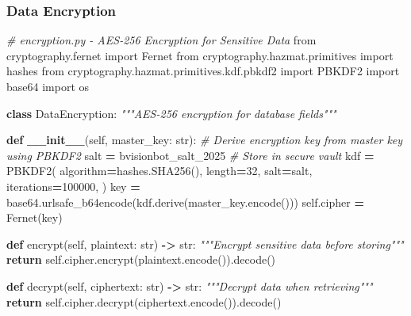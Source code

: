 \documentclass[
]{article}
\newenvironment{Shaded}{\begin{snugshade}}{\end{snugshade}}
\newcommand{\BuiltInTok}[1]{#1}
\newcommand{\CommentTok}[1]{\textcolor[rgb]{0.56,0.35,0.01}{\textit{#1}}}
\newcommand{\ControlFlowTok}[1]{\textcolor[rgb]{0.13,0.29,0.53}{\textbf{#1}}}
\newcommand{\DecValTok}[1]{\textcolor[rgb]{0.00,0.00,0.81}{#1}}
\newcommand{\FunctionTok}[1]{\textcolor[rgb]{0.13,0.29,0.53}{\textbf{#1}}}
\newcommand{\ImportTok}[1]{#1}
\newcommand{\KeywordTok}[1]{\textcolor[rgb]{0.13,0.29,0.53}{\textbf{#1}}}
\newcommand{\NormalTok}[1]{#1}
\newcommand{\OperatorTok}[1]{\textcolor[rgb]{0.81,0.36,0.00}{\textbf{#1}}}
\newcommand{\StringTok}[1]{\textcolor[rgb]{0.31,0.60,0.02}{#1}}
\newcommand{\VariableTok}[1]{\textcolor[rgb]{0.00,0.00,0.00}{#1}}
\begin{document}
\hypertarget{data-encryption}{%
\subsubsection{Data Encryption}\label{data-encryption}}

\begin{Shaded}
\begin{Highlighting}[]
\CommentTok{\# encryption.py {-} AES{-}256 Encryption for Sensitive Data}
\ImportTok{from}\NormalTok{ cryptography.fernet }\ImportTok{import}\NormalTok{ Fernet}
\ImportTok{from}\NormalTok{ cryptography.hazmat.primitives }\ImportTok{import}\NormalTok{ hashes}
\ImportTok{from}\NormalTok{ cryptography.hazmat.primitives.kdf.pbkdf2 }\ImportTok{import}\NormalTok{ PBKDF2}
\ImportTok{import}\NormalTok{ base64}
\ImportTok{import}\NormalTok{ os}

\KeywordTok{class}\NormalTok{ DataEncryption:}
    \CommentTok{"""AES{-}256 encryption for database fields"""}

    \KeywordTok{def} \FunctionTok{\_\_init\_\_}\NormalTok{(}\VariableTok{self}\NormalTok{, master\_key: }\BuiltInTok{str}\NormalTok{):}
        \CommentTok{\# Derive encryption key from master key using PBKDF2}
\NormalTok{        salt }\OperatorTok{=} \StringTok{b\textquotesingle{}visionbot\_salt\_2025\textquotesingle{}}  \CommentTok{\# Store in secure vault}
\NormalTok{        kdf }\OperatorTok{=}\NormalTok{ PBKDF2(}
\NormalTok{            algorithm}\OperatorTok{=}\NormalTok{hashes.SHA256(),}
\NormalTok{            length}\OperatorTok{=}\DecValTok{32}\NormalTok{,}
\NormalTok{            salt}\OperatorTok{=}\NormalTok{salt,}
\NormalTok{            iterations}\OperatorTok{=}\DecValTok{100000}\NormalTok{,}
\NormalTok{        )}
\NormalTok{        key }\OperatorTok{=}\NormalTok{ base64.urlsafe\_b64encode(kdf.derive(master\_key.encode()))}
        \VariableTok{self}\NormalTok{.cipher }\OperatorTok{=}\NormalTok{ Fernet(key)}

    \KeywordTok{def}\NormalTok{ encrypt(}\VariableTok{self}\NormalTok{, plaintext: }\BuiltInTok{str}\NormalTok{) }\OperatorTok{{-}\textgreater{}} \BuiltInTok{str}\NormalTok{:}
        \CommentTok{"""Encrypt sensitive data before storing"""}
        \ControlFlowTok{return} \VariableTok{self}\NormalTok{.cipher.encrypt(plaintext.encode()).decode()}

    \KeywordTok{def}\NormalTok{ decrypt(}\VariableTok{self}\NormalTok{, ciphertext: }\BuiltInTok{str}\NormalTok{) }\OperatorTok{{-}\textgreater{}} \BuiltInTok{str}\NormalTok{:}
        \CommentTok{"""Decrypt data when retrieving"""}
        \ControlFlowTok{return} \VariableTok{self}\NormalTok{.cipher.decrypt(ciphertext.encode()).decode()}


\end{Highlighting}
\end{Shaded}
\end{document}
